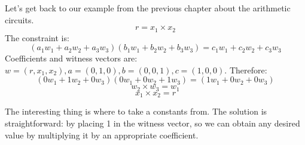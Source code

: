 \documentclass[../lecture-notes.tex]{subfiles}
\begin{document}
\begin{example}
    Let's get back to our example from the previous chapter about the arithmetic circuits.
    \[ r = x_1 \times x_2 \]
    The constraint is:
    \[(a_1w_1 + a_2w_2 + a_3w_3)(b_1w_1 + b_2w_2 + b_3w_3) = c_1w_1 + c_2w_2 + c_3w_3\]
    Coefficients and witness vectors are:
    $w = (r, x_1, x_2), a = (0, 1, 0), b = (0, 0, 1), c = (1, 0, 0)$. Therefore:
    \[ (0w_1 + 1w_2 + 0w_3)(0w_1 + 0w_2 + 1w_3) = (1w_1 + 0w_2 + 0w_3) \]
    \[ w_2 \times w_3 = w_1 \]
    \[ x_1 \times x_2 = r \]
\end{example}

The interesting thing is where to take a constants from. The solution is straightforward: by placing
1 in the witness vector, so we can obtain any desired value by multiplying it by an appropriate 
coefficient.
\end{document}
